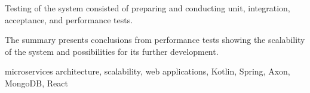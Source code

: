 \documentclass[
    bindingoffset=5mm,  %
    footnoteindent=3mm, %
    hyphenation=true    %
]{src/wut-thesis}
\begin{document}
Testing of the system consisted of preparing and conducting unit, integration, acceptance, and performance tests.

The summary presents conclusions from performance tests showing the scalability of the system and possibilities for its further development.

\secondkeywords microservices architecture, scalability, web applications, Kotlin, Spring, Axon, MongoDB, React

\pagestyle{plain}

\cleardoublepage %
\tableofcontents

\cleardoublepage %
\pagestyle{headings}








\cleardoublepage %
\printbibliography
\clearpage


\pagestyle{plain}

\listoffigurestoc    %
\vspace{1cm}         %
\listoftablestoc     %
\vspace{1cm}         %
\listoflistingstoc   %


\end{document}
